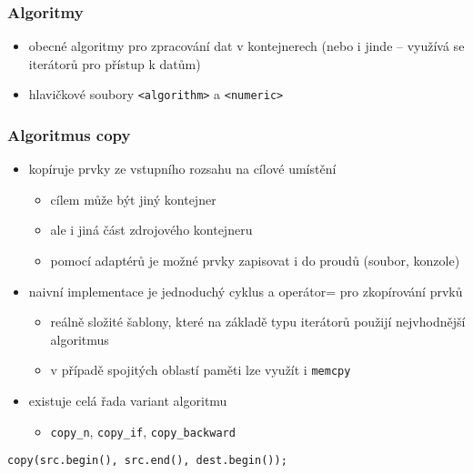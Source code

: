 

\begin{frame}[fragile]
\frametitle{Algoritmy}
\begin{block}{}
\begin{itemize}
\item obecné algoritmy pro zpracování dat v kontejnerech (nebo i jinde -- využívá se iterátorů pro přístup k datům)
\item hlavičkové soubory \lstinline|<algorithm>| a \lstinline|<numeric>|
\end{itemize}
\end{block}
\end{frame}




\begin{frame}[fragile]
\frametitle{Algoritmus copy}
\begin{block}{}
\begin{itemize}
\item kopíruje prvky ze vstupního rozsahu na cílové umístění
\begin{itemize}
\item cílem může být jiný kontejner
\item ale i jiná část zdrojového kontejneru
\item pomocí adaptérů je možné prvky zapisovat i do proudů (soubor, konzole)
\end{itemize}
\item naivní implementace je jednoduchý cyklus a operátor= pro zkopírování prvků
\begin{itemize}
\item reálně složité šablony, které na základě typu iterátorů použijí nejvhodnější algoritmus
\item v případě spojitých oblastí paměti lze využít i \lstinline|memcpy|
\end{itemize}
\item existuje celá řada variant algoritmu
\begin{itemize}
\item \lstinline|copy_n|, \lstinline|copy_if|, \lstinline|copy_backward|

\end{itemize}
\end{itemize}
\end{block}

\begin{yesblock}
\begin{lstlisting}
copy(src.begin(), src.end(), dest.begin());
\end{lstlisting}
\end{yesblock}
\end{frame}


